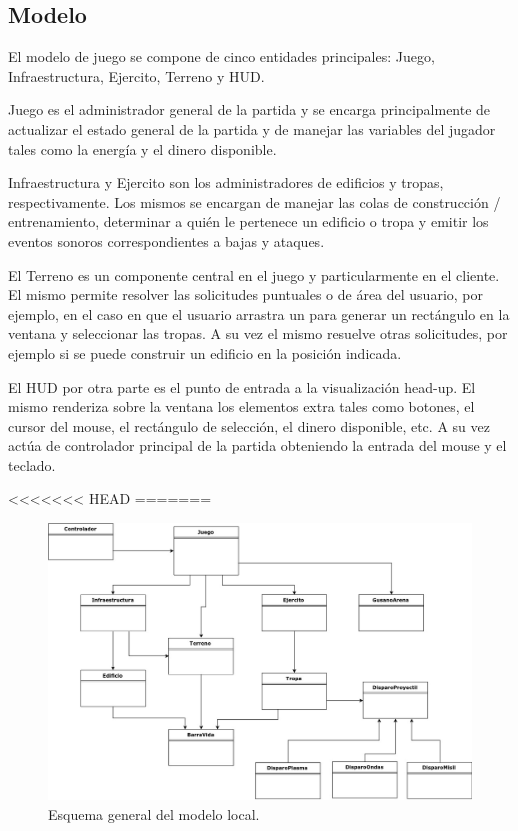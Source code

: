 \documentclass[titlepage,a4paper,12pt]{article}
\begin{document}
\subsection{Modelo}
El modelo de juego se compone de cinco entidades principales: Juego, Infraestructura, Ejercito, Terreno y HUD. 

Juego es el administrador general de la partida y se encarga principalmente de actualizar el estado general de la partida y de manejar las variables del jugador tales como la energía y el dinero disponible.

Infraestructura y Ejercito son los administradores de edificios y tropas, respectivamente. Los mismos se encargan de manejar las colas de construcción / entrenamiento, determinar a quién le pertenece un edificio o tropa y emitir los eventos sonoros correspondientes a bajas y ataques.

El Terreno es un componente central en el juego y particularmente en el cliente. El mismo permite resolver las solicitudes puntuales o de área del usuario, por ejemplo, en el caso en que el usuario arrastra un para generar un rectángulo en la ventana y seleccionar las tropas. A su vez el mismo resuelve otras solicitudes, por ejemplo si se puede construir un edificio en la posición indicada.

El HUD por otra parte es el punto de entrada a la visualización head-up. El mismo renderiza sobre la ventana los elementos extra tales como botones, el cursor del mouse, el rectángulo de selección, el dinero disponible, etc. A su vez actúa de controlador principal de la partida obteniendo la entrada del mouse y el teclado.

<<<<<<< HEAD
=======
\begin{figure}[H]
	\centering
	\includegraphics[width=14cm]{../imagenes/esquema-cliente-modelo.jpg}
	\caption{\label{fig:esquema-cliente-modelo} Esquema general del modelo local.}
\end{figure}
\end{document}
